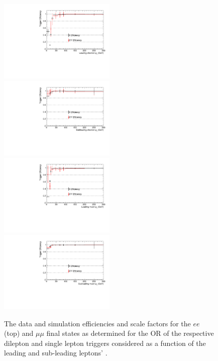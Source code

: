\begin{figure}[ht]
\centering
\includegraphics[width=0.495\textwidth]{figs/background-estimation/triggerEfficiency/DY/electron1_pT_eff.pdf}
\includegraphics[width=0.495\textwidth]{figs/background-estimation/triggerEfficiency/DY/electron2_pT_eff.pdf}
\\
\includegraphics[width=0.495\textwidth]{figs/background-estimation/triggerEfficiency/DY/muon1_pT_eff.pdf}
\includegraphics[width=0.495\textwidth]{figs/background-estimation/triggerEfficiency/DY/muon2_pT_eff.pdf}
\caption{
The data and \ttbar simulation efficiencies and scale factors for the $ee$ (top) and $\mu\mu$ final states as determined for the OR of the respective dilepton and single lepton triggers considered as a function of the leading and sub-leading leptons' \pT.
}
\label{fig:trig_pT_eff_syst}
\end{figure}


